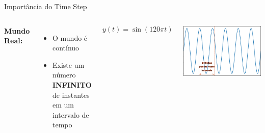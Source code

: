 \begin{frame}{\color{blue} Importância do {Time Step}}
\centering
\color{blue}

\begin{columns}


\centering
\textbf{Mundo Real:}

\begin{itemize}
\vspace*{0.5cm}
\item O mundo é contínuo
\vspace*{1cm}
\item Existe um número \textbf{INFINITO} de instantes em um intervalo de tempo  
\vspace*{1.5cm}
\end{itemize}




\centering

\begin{equation*}
y(t) = \sin(120\pi t)
\end{equation*}

\includegraphics[width=0.95\linewidth]{./figuras/Primeiros-Passos/Sin_continuo}


\end{columns}



\end{frame}





